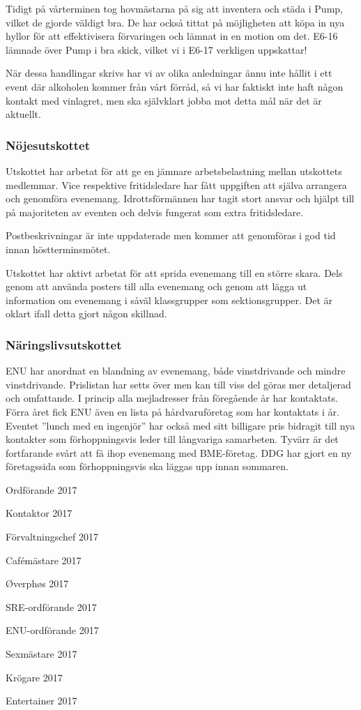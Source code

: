 \documentclass[../_main/handlingar.tex]{subfiles}
\begin{document}
Tidigt på vårterminen tog hovmästarna på sig att inventera och städa i Pump, vilket de gjorde väldigt bra. De har också tittat på möjligheten att köpa in nya hyllor för att effektivisera förvaringen och lämnat in en motion om det. E6-16 lämnade över Pump i bra skick, vilket vi i E6-17 verkligen uppskattar!

När dessa handlingar skrivs har vi av olika anledningar ännu inte hållit i ett event där alkoholen kommer från vårt förråd, så vi har faktiskt inte haft någon kontakt med vinlagret, men ska självklart jobba mot detta mål när det är aktuellt.

\subsubsection*{Nöjesutskottet}
Utskottet har arbetat för att ge en jämnare arbetsbelastning mellan utskottets medlemmar. Vice respektive fritidsledare har fått uppgiften att själva arrangera och genomföra evenemang. Idrottsförmännen har tagit stort ansvar och hjälpt till på majoriteten av eventen och delvis fungerat som extra fritidsledare.

Postbeskrivningar är inte uppdaterade men kommer att genomföras i god tid innan höstterminsmötet.

Utskottet har aktivt arbetat för att sprida evenemang till en större skara. Dels genom att använda posters till alla evenemang och genom att lägga ut information om evenemang i såväl klassgrupper som sektionsgrupper. Det är oklart ifall detta gjort någon skillnad.


\subsubsection*{Näringslivsutskottet}
ENU har anordnat en blandning av evenemang, både vinstdrivande och mindre vinstdrivande.  Prislistan har setts över men kan till viss del göras mer detaljerad och omfattande. I princip alla mejladresser från föregående år har kontaktats. Förra året fick ENU även en lista på hårdvaruföretag som har kontaktats i år. Eventet ”lunch med en ingenjör” har också med sitt billigare pris bidragit till nya kontakter som förhoppningsvis leder till långvariga samarbeten. Tyvärr är det fortfarande svårt att få ihop evenemang med BME-företag. DDG har gjort en ny företagssida som förhoppningsvis ska läggas upp innan sommaren.

\newpage
\begin{signatures}{10}
    \mvh
    \signature{Erik Månsson}{Ordförande 2017}
    \signature{Johan Karlberg}{Kontaktor 2017}
    \signature{Sophia Grimmeiss Grahm}{Förvaltningschef 2017}
    \signature{Daniel Bakic}{Cafémästare 2017}
    \signature{Niklas Gustafson}{Øverphøs 2017}
    \signature{Pontus Landgren}{SRE-ordförande 2017}
    \signature{Josefine Sandström}{ENU-ordförande 2017}
    \signature{Linnea Sjödahl}{Sexmästare 2017}
    \signature{Markus Rahne}{Krögare 2017}
    \signature{Albin Nyström Eklund}{Entertainer 2017}
\end{signatures}
\end{document}
